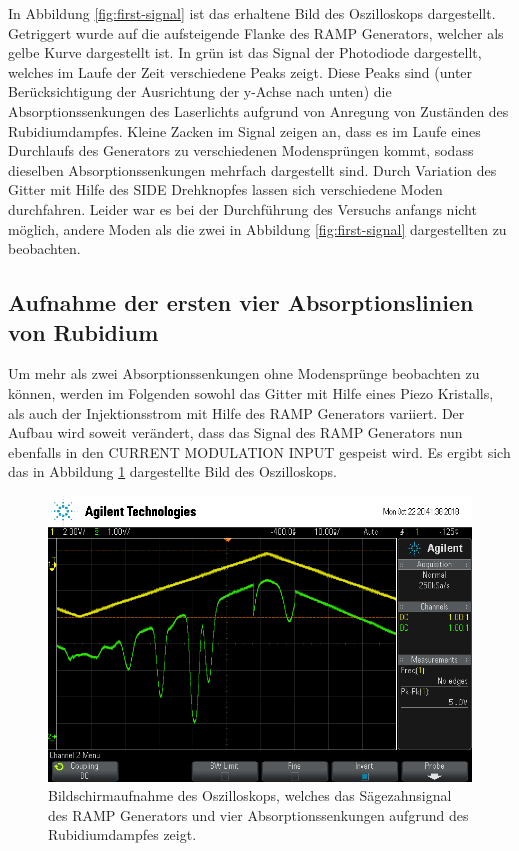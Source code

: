 In Abbildung \ref{fig:first-signal} ist das erhaltene Bild des Oszilloskops dargestellt.
Getriggert wurde auf die aufsteigende Flanke des RAMP Generators, welcher als gelbe
Kurve dargestellt ist. In grün ist das Signal der Photodiode dargestellt, welches
im Laufe der Zeit verschiedene Peaks zeigt. Diese Peaks sind (unter Berücksichtigung
der Ausrichtung der y-Achse nach unten) die Absorptionssenkungen des
Laserlichts aufgrund von Anregung von Zuständen des Rubidiumdampfes.
Kleine Zacken im Signal zeigen an, dass es im Laufe eines Durchlaufs des Generators
zu verschiedenen Modensprüngen kommt, sodass dieselben Absorptionssenkungen mehrfach
dargestellt sind.
Durch Variation des Gitter mit Hilfe des SIDE Drehknopfes lassen sich verschiedene
Moden durchfahren. Leider war es bei der Durchführung des Versuchs anfangs nicht möglich,
andere Moden als die zwei in Abbildung \ref{fig:first-signal} dargestellten zu
beobachten.

\subsection{Aufnahme der ersten vier Absorptionslinien von Rubidium}
\label{sec:AbsorptionImproved}

Um mehr als zwei Absorptionssenkungen ohne Modensprünge beobachten zu können, werden im Folgenden
sowohl das Gitter mit Hilfe eines Piezo Kristalls, als auch der Injektionsstrom
mit Hilfe des RAMP Generators variiert.
Der Aufbau wird soweit verändert, dass das Signal des RAMP Generators nun ebenfalls
in den CURRENT MODULATION INPUT gespeist wird.
Es ergibt sich das in Abbildung \ref{fig:second-signal} dargestellte Bild des
Oszilloskops.

\begin{figure}
	\centering
	\includegraphics[width=.8\textwidth]{images/second-signal.png}
	\caption{Bildschirmaufnahme des Oszilloskops, welches das Sägezahnsignal des
	RAMP Generators und vier Absorptionssenkungen aufgrund des Rubidiumdampfes zeigt.}
	\label{fig:second-signal}
\end{figure}

